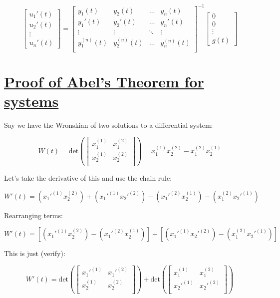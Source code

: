 \documentclass{report}
\begin{document}
$$
\begin{bmatrix}
    u_1'(t) \\
    u_2'(t) \\
    \vdots \\ 
    u_n'(t)
\end{bmatrix}
=
\begin{bmatrix}
    y_1(t) & y_2(t) & \dots  & y_n(t) \\
    y_1'(t) & y_2'(t) & \dots  & y_n'(t) \\
    \vdots & \vdots & \ddots & \vdots \\
    y_1^{(n)}(t) & y_2^{(n)}(t) & \dots  & y_n^{(n)}(t) \\
\end{bmatrix}^{-1}
\begin{bmatrix}
    0 \\
    0 \\
    \vdots \\ 
    g(t)
\end{bmatrix}
$$

\section{\hyperref[th:wronAbelSys]{Proof of Abel's Theorem for systems}}
\label{sec:wronAbelSys}

Say we have the Wronskian of two solutions to a differential system:

$$
W(t) =
\text{det}\left(
\begin{bmatrix}
    x_1^{(1)} & x_1^{(2)} \\
    x_2^{(1)} & x_2^{(2)} \\
\end{bmatrix}\right)
=x_1^{(1)}x_2^{(2)}-x_1^{(2)}x_2^{(1)}
$$

Let's take the derivative of this and use the chain rule:

$$W'(t) = (x_1'^{(1)}x_2^{(2)}) + (x_1'^{(1)}x_2'^{(2)}) - (x_1'^{(2)}x_2^{(1)}) - (x_1^{(2)}x_2'^{(1)})$$

Rearranging terms:

$$W'(t) = [(x_1'^{(1)}x_2^{(2)}) 
- (x_1'^{(2)}x_2^{(1)})]
+ [(x_1'^{(1)}x_2'^{(2)})  - (x_1^{(2)}x_2'^{(1)})]$$

This is just (verify):

$$
W'(t) =
\text{det}\left(
\begin{bmatrix}
    x_1'^{(1)} & x_1'^{(2)} \\
    x_2^{(1)} & x_2^{(2)} \\
\end{bmatrix}\right)
+
\text{det}\left(
\begin{bmatrix}
    x_1^{(1)} & x_1^{(2)} \\
    x_2'^{(1)} & x_2'^{(2)} \\
\end{bmatrix}\right)
$$
\end{document}
